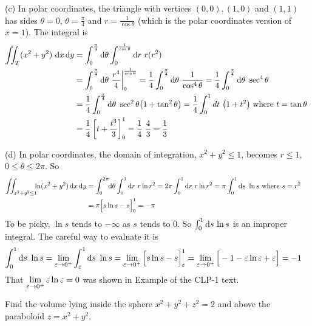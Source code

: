 \begin{solution}
(c) In polar coordinates, the triangle
with vertices $(0,0), (1,0)$ and $(1,1)$ has sides $\theta=0$, 
$\theta=\frac{\pi}{4}$ and $r=\frac{1}{\cos\theta}$ (which is the polar 
coordinates version of $x=1$). The integral is 
\begin{align*}
\dblInt_T (x^2+y^2)\ \dee{x}\,\dee{y}
&=\int_0^{{\pi\over 4}}\dee{\theta}\int_0^{1\over\cos\theta} 
                                                  \dee{r}\ r(r^2)\\
&=\int_0^{{\pi\over 4}}\dee{\theta}\ 
\frac{r^4}{4}\bigg|_0^{1\over\cos\theta}  
=\frac{1}{4}\int_0^{{\pi\over 4}}\dee{\theta}\ \frac{1}{\cos^4\theta}
=\frac{1}{4}\int_0^{{\pi\over 4}}\dee{\theta}\ \sec^4\theta\cr
&=\frac{1}{4}\int_0^{{\pi\over 4}}\dee{\theta}\ \sec^2\theta\big(1+\tan^2\theta\big)
=\frac{1}{4}\int_0^1d t\ \big(1+t^2\big)\text{ where $t=\tan\theta$ }\cr
&=\frac{1}{4}\left[t+\frac{t^3}{3}\right]_0^1
=\frac{1}{4}\ \frac{4}{3}
=\frac{1}{3}
\end{align*}

(d) In polar coordinates, the domain of integration,
$x^2+y^2\le 1$, becomes $r\le 1$, $0\le\theta\le 2\pi$. So
\begin{align*}
\iint_{x^2+y^2\le 1}\hskip-5pt \ln(x^2+y^2)\,\mathrm{d}x\,\mathrm{d}y
&=\int_0^{2\pi}\hskip-3pt \mathrm{d}\theta\int_0^1\mathrm{d}r\ r\ln r^2
=2\pi\int_0^1\mathrm{d}r\ r\ln r^2
=\pi\int_0^1 \mathrm{d}s\ \ln s\text{ where $s=r^2$ }\cr
&=\pi\Big[s\ln s-s\Big]_0^1
=-\pi
\end{align*}
To be picky, $\ln s$ tends to $-\infty$ as $s$ tends to $0$.
So $\int_0^1\mathrm{d}s\,\ln s$ is an improper integral. The careful way to
evaluate it is
\begin{align*}
\int_0^1 \mathrm{d}s\ \ln s
&=\lim_{\varepsilon\to 0^+}\int_\varepsilon^1 \mathrm{d}s\ \ln s
=\lim_{\varepsilon\to 0^+}\Big[s\ln s-s\Big]_\varepsilon^1
=\lim_{\varepsilon\to 0^+}\Big[-1-\varepsilon\ln\varepsilon+\varepsilon\Big]
=-1
\end{align*}
That $\lim\limits_{\varepsilon\to 0^+}\varepsilon\ln\varepsilon = 0$ was shown in 
Example \eref{CLP100}{eg:hopitalJ} of the CLP-1 text.


\end{solution}

\begin{question}
Find the volume lying inside the sphere $x^2+y^2+z^2=2$ 
and above the paraboloid $z=x^2+y^2$.
\end{question}

%

